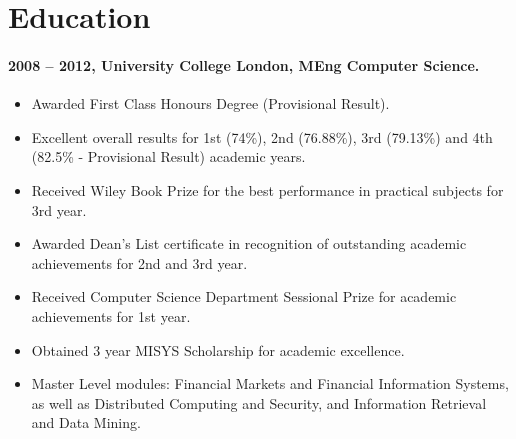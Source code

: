 \documentclass[11pt, a4paper]{article}
\newlength{\wideitemsep}
\let\olditem\item
\renewcommand{\item}{\setlength{\itemsep}{\wideitemsep}\olditem}
\begin{document}
\section*{Education}
\paragraph{2008 – 2012, University College London, MEng Computer Science.}
\begin{itemize}
\item Awarded First Class Honours Degree (Provisional Result).
\item Excellent overall results for 1st (74\%), 2nd (76.88\%), 3rd (79.13\%) and 4th (82.5\% - Provisional Result) academic years.
\item Received Wiley Book Prize for the best performance in practical subjects for 3rd year.
\item Awarded Dean's List certificate in recognition of outstanding academic achievements for 2nd and 3rd year.
\item Received Computer Science Department Sessional Prize for academic achievements for 1st year.
\item Obtained 3 year MISYS Scholarship for academic excellence.
\item Master Level modules: Financial Markets and Financial Information Systems, as well as Distributed Computing and Security, and Information Retrieval and Data Mining.
\end{itemize}
\end{document}
